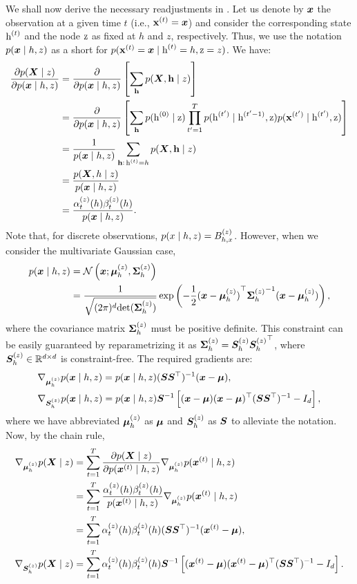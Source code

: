 We shall now derive the necessary readjustments in . Let us denote by ${\bm{x}}$ the observation at a given time $t$ (i.e., ${\mathbf{x}}^{(t)}={\bm{x}}$) and consider the corresponding state ${\textnormal{h}}^{(t)}$ and the node ${\textnormal{z}}$ as fixed at $h$ and $z$, respectively. Thus, we use the notation $p({\bm{x}} \mid h, z)$ as a short for $p({\mathbf{x}}^{(t)}={\bm{x}} \mid {\textnormal{h}}^{(t)}=h, {\textnormal{z}}=z)$. We have:
\begin{align}
\frac{\partial p({\bm{X}} \mid z)}{\partial p({\bm{x}} \mid h, z)} &= \frac{\partial}{\partial p({\bm{x}} \mid h, z)} \left[\sum_{{\mathbf{h}}} p({\bm{X}}, {\mathbf{h}} \mid z)  \right] \nonumber\\
&= \frac{\partial}{\partial p({\bm{x}} \mid h, z)} \left[\sum_{{\mathbf{h}}} p({\textnormal{h}}^{(0)} \mid {\textnormal{z}}) \prod_{t'=1}^T p({\textnormal{h}}^{(t')} \mid {\textnormal{h}}^{(t'-1)},{\textnormal{z}}) p({\mathbf{x}}^{(t')} \mid {\textnormal{h}}^{(t')},{\textnormal{z}})\right] \nonumber\\
&= \frac{1}{p({\bm{x}} \mid h, z)} \sum_{{\mathbf{h}}:\, {\textnormal{h}}^{(t)}=h} p({\bm{X}}, {\mathbf{h}} \mid z) \nonumber\\
&= \frac{p({\bm{X}}, h \mid z)}{p({\bm{x}} \mid h, z)} \nonumber\\
&= \frac{\alpha_{t}^{(z)}(h) \beta_{t}^{(z)}(h)}{p({\bm{x}} \mid h, z)}.
\end{align}
Note that, for discrete observations, $p(x \mid h, z) = {B}^{(z)}_{h,x}$. However, when we consider the multivariate Gaussian case,
\begin{align}
p({\bm{x}} \mid h, z) &= \mathcal{N}\left({\bm{x}}; {\bm{\mu}}^{(z)}_h, {\bm{\Sigma}}^{(z)}_h\right) \nonumber\\
&= \frac{1}{\sqrt{(2\pi)^d \mathrm{det}({\bm{\Sigma}}^{(z)}_h)}} \exp \left(-\frac{1}{2} {({\bm{x}} - {\bm{\mu}}^{(z)}_h)}^\top {{\bm{\Sigma}}^{(z)}_h}^{-1} ({\bm{x}} - {\bm{\mu}}^{(z)}_h)\right),
\end{align}
where the covariance matrix ${\bm{\Sigma}}^{(z)}_h$ must be positive definite. This constraint can be easily guaranteed by reparametrizing it as ${\bm{\Sigma}}^{(z)}_h = {\bm{S}}^{(z)}_h {{\bm{S}}^{(z)}_h}^\top$, where ${\bm{S}}^{(z)}_h \in {\mathbb{R}}^{d \times d}$ is constraint-free. The required gradients are:
\begin{align}
&\nabla_{{\bm{\mu}}^{(z)}_h} p({\bm{x}} \mid h, z) = p({\bm{x}} \mid h, z) ({\bm{S}} {\bm{S}}^\top)^{-1} ({\bm{x}} - {\bm{\mu}}), \\
&\nabla_{{\bm{S}}^{(z)}_h} p({\bm{x}} \mid h, z) = p({\bm{x}} \mid h, z) {\bm{S}}^{-1} \left[ ({\bm{x}} - {\bm{\mu}}) ({\bm{x}} - {\bm{\mu}})^\top ({\bm{S}} {\bm{S}} ^\top)^{-1} - I_d\right],
\end{align}
where we have abbreviated ${\bm{\mu}}^{(z)}_h$ as ${\bm{\mu}}$ and ${\bm{S}}^{(z)}_h$ as ${\bm{S}}$ to alleviate the notation. Now, by the chain rule,
\begin{align}
\nabla_{{\bm{\mu}}^{(z)}_h} p({\bm{X}} \mid z) &= \sum_{t=1}^T \frac{\partial p({\bm{X}} \mid z)}{\partial p({\bm{x}}^{(t)} \mid h, z)} \nabla_{{\bm{\mu}}^{(z)}_h} p({\bm{x}}^{(t)} \mid h, z) \nonumber\\
&= \sum_{t=1}^T \frac{\alpha_{t}^{(z)}(h) \beta_{t}^{(z)}(h)}{p({\bm{x}}^{(t)} \mid h, z)} \nabla_{{\bm{\mu}}^{(z)}_h} p({\bm{x}}^{(t)} \mid h, z) \nonumber\\
&= \sum_{t=1}^T \alpha_{t}^{(z)}(h) \beta_{t}^{(z)}(h) ({\bm{S}} {\bm{S}} ^\top)^{-1} ({\bm{x}}^{(t)} - {\bm{\mu}}), \\
\nabla_{{\bm{S}}^{(z)}_h} p({\bm{X}} \mid z) &= \sum_{t=1}^T \alpha_{t}^{(z)}(h) \beta_{t}^{(z)}(h) {\bm{S}}^{-1} \left[ ({\bm{x}}^{(t)} - {\bm{\mu}}) ({\bm{x}}^{(t)} - {\bm{\mu}})^\top ({\bm{S}} {\bm{S}} ^\top)^{-1} - I_d\right].
\end{align}
